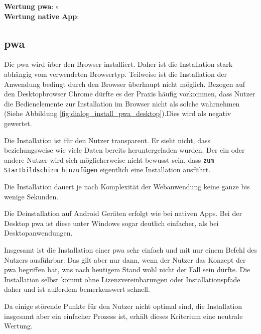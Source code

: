 \textbf{Wertung \ac{pwa}}: $\circ$ \\
\textbf{Wertung native App}:  \\

\subsection{\ac{pwa}}
Die \ac{pwa} wird über den Browser installiert. Daher ist die Installation stark abhängig vom verwendeten Browsertyp. Teilweise ist die Installation der Anwendung bedingt durch den Browser überhaupt nicht möglich. Bezogen auf den Desktopbrowser Chrome dürfte es der Praxis häufig vorkommen, dass Nutzer die Bedienelemente zur Installation im Browser nicht als solche wahrnehmen (Siehe Abbildung \ref{fig:dialog_install_pwa_desktop}).Dies wird als negativ gewertet.

Die Installation ist für den Nutzer transparent. Er sieht nicht, dass beziehungsweise wie viele Daten bereits heruntergeladen wurden. Der ein oder andere Nutzer wird sich möglicherweise nicht bewusst sein, dass \texttt{zum Startbildschirm hinzufügen} eigentlich eine Installation ausführt.

Die Installation dauert je nach Komplexität der Webanwendung keine ganze bis wenige Sekunden.

Die Deinstallation auf Android Geräten erfolgt wie bei nativen Apps. Bei der Desktop \ac{pwa} ist diese unter Windows sogar deutlich einfacher, als bei Desktopanwendungen.

Insgesamt ist die Installation einer \ac{pwa} sehr einfach und mit nur einem Befehl des Nutzers ausführbar. Das gilt aber nur dann, wenn der Nutzer das Konzept der \ac{pwa} begriffen hat, was nach heutigem Stand wohl nicht der Fall sein dürfte. Die Installation selbst kommt ohne Lizenzvereinbarungen oder Installationspfade daher und ist außerdem bemerkenswert schnell.

Da einige störende Punkte für den Nutzer nicht optimal sind, die Installation insgesamt aber ein einfacher Prozess ist, erhält dieses Kriterium eine neutrale Wertung.
